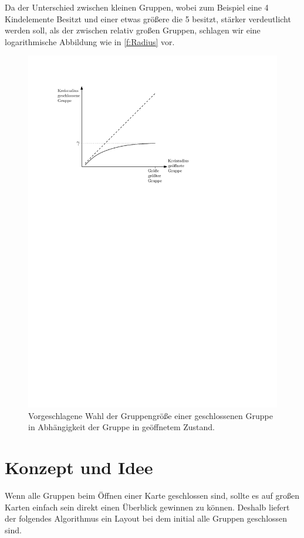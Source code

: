 Da der Unterschied zwischen kleinen Gruppen, wobei zum Beispiel eine 4 Kindelemente Besitzt und einer etwas größere die 5 besitzt, stärker verdeutlicht werden soll, als der zwischen 
relativ großen Gruppen, schlagen wir eine logarithmische Abbildung wie in \autoref{f:Radius} vor.
\begin{figure}[h!]
\begin{center} 
\includegraphics{Pics/Radius.pdf}
  \caption{Vorgeschlagene Wahl der Gruppengröße einer geschlossenen Gruppe in Abhängigkeit der Gruppe in geöffnetem Zustand. }
  \label{f:Radius}
\end{center}
\end{figure}


\section{Konzept und Idee}
Wenn alle Gruppen beim Öffnen einer Karte geschlossen sind, sollte es auf großen Karten einfach sein direkt einen Überblick gewinnen zu können.
Deshalb liefert der folgendes Algorithmus ein Layout bei dem initial alle Gruppen geschlossen sind.

